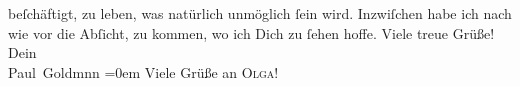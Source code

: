 \begin{ledgroupsized}[t]{13cm}
               beſchäftigt, zu leben, was natürlich unmöglich ſein wird. Inzwiſchen habe ich {\pb}nach wie vor die Abſicht, \label{K_L03210-2v}\label{K_L03210-2h} zu kommen, wo ich
               Dich zu ſehen hoffe.\pend
           \pstart
           Viele treue Grüße! {\\[\baselineskip]}Dein {\\[\baselineskip]}\spacefill\mbox{Paul Goldmnn}\pend
           \leftskip=0em{}\pstart
           \noindent{}Viele Grüße an \textsc{Olga}!\pend
           
         
         \endnumbering{}\end{ledgroupsized}  \newcommand{\dateiname}{L03210}\newcommand{\titel}{Paul Goldmann an Arthur Schnitzler, 9. 6. [1902]}\newcommand{\editorInnen}{Martin Anton Müller und Laura Untner}
      